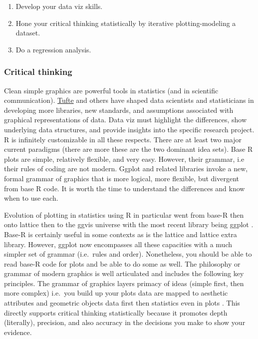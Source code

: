 \documentclass[
]{book}
\providecommand{\tightlist}{%
  \setlength{\itemsep}{0pt}\setlength{\parskip}{0pt}}
\begin{document}
\begin{enumerate}
\def\labelenumi{\arabic{enumi}.}
\tightlist
\item
  Develop your data viz skills.\\
\item
  Hone your critical thinking statistically by iterative plotting-modeling a dataset.\\
\item
  Do a regression analysis.
\end{enumerate}

\hypertarget{critical-thinking-2}{%
\subsubsection*{Critical thinking}\label{critical-thinking-2}}

Clean simple graphics are powerful tools in statistics (and in scientific communication). \href{https://www.edwardtufte.com/tufte/}{Tufte} \citep{RN2096} and others have shaped data scientists and statisticians in developing more libraries, new standards, and assumptions associated with graphical representations of data. Data viz must highlight the differences, show underlying data structures, and provide insights into the specific research project. R is infinitely customizable in all these respects. There are at least two major current paradigms (there are more these are the two dominant idea sets). Base R plots are simple, relatively flexible, and very easy. However, their grammar, i.e their rules of coding are not modern. Ggplot and related libraries invoke a new, formal grammar of graphics \citep{RN7256} that is more logical, more flexible, but divergent from base R code. It is worth the time to understand the differences and know when to use each.

Evolution of plotting in statistics using R in particular went from base-R then onto lattice then to the ggvis universe with the most recent library being ggplot \citep{RN4413}. Base-R is certainly useful in some contexts as is the lattice and lattice extra library. However, ggplot now encompasses all these capacities with a much simpler set of grammar (i.e.~rules and order). Nonetheless, you should be able to read base-R code for plots and be able to do some as well. The philosophy or grammar of modern graphics is well articulated and includes the following key principles. The grammar of graphics layers primacy of ideas (simple first, then more complex) i.e.~you build up your plots data are mapped to aesthetic attributes and geometric objects data first then statistics even in plots \citep{RN7255}. This directly supports critical thinking statistically because it promotes depth (literally), precision, and also accuracy in the decisions you make to show your evidence.
\end{document}
